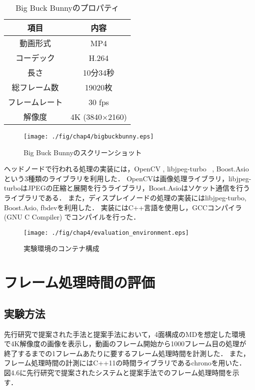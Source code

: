 \begin{table}[htbp]
    \caption{Big Buck Bunnyのプロパティ}
    \begin{center}
    \begin{tabular}{cc}
    \hline
    項目 & 内容 \\\hline\hline
    動画形式　& MP4 \\ \hline
    コーデック & H.264 \cite{h264} \\ \hline
    長さ & 10分34秒 \\ \hline
    総フレーム数 & 19020枚 \\ \hline
    フレームレート & 30 fps \\ \hline
    解像度 & 4K (3840×2160) \\ \hline

    \end{tabular}
    \end{center}
\end{table}

\begin{figure}[H]
    \hspace*{\fill}
    \texttt{[image: ./fig/chap4/bigbuckbunny.eps]}
    \hspace*{\fill}
    \caption{Big Buck Bunnyのスクリーンショット}
   \end{figure}

ヘッドノードで行われる処理の実装には，OpenCV \cite{opencv}, libjpeg-turbo ~\cite{libjpeg}, Boost.Asio \cite{asio}という3種類のライブラリを利用した． 
OpenCVは画像処理ライブラリ，libjpeg-turboはJPEGの圧縮と展開を行うライブラリ，Boost.Asioはソケット通信を行うライブラリである．
また，ディスプレイノードの処理の実装にはlibjpeg-turbo, Boost.Asio, fbdevを利用した．
実装にはC++言語を使用し，GCCコンパイラ (GNU C Compiler) \cite{gcc}でコンパイルを行った．

\begin{figure}[H]
    \hspace*{\fill}
    \texttt{[image: ./fig/chap4/evaluation\_environment.eps]}
    \hspace*{\fill}
    \caption{実験環境のコンテナ構成}
   \end{figure}

\section{フレーム処理時間の評価}

\subsection{実験方法}
先行研究で提案された手法と提案手法において，4面構成のMDを想定した環境で4K解像度の画像を表示し，動画のフレーム開始から1000フレーム目の処理が終了するまでの1フレームあたりに要するフレーム処理時間を計測した．
また，フレーム処理時間の計測にはC++11の時間ライブラリであるchronoを用いた．
図4.6に先行研究で提案されたシステムと提案手法でのフレーム処理時間を示す．

